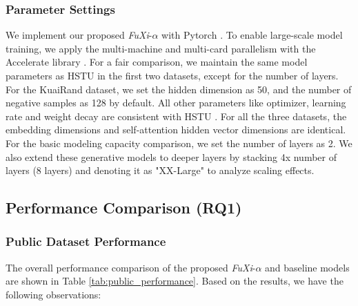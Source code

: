 \subsubsection{Parameter Settings}
We implement our proposed \textit{FuXi}-$\alpha$ with Pytorch \cite{paszke2019pytorch}.
To enable large-scale model training, we apply the multi-machine and multi-card parallelism with the Accelerate library \cite{kotter2012accelerate}.
For a fair comparison, we maintain the same model parameters as HSTU \cite{zhai2024actions} in the first two datasets,
except for the number of layers.
For the KuaiRand dataset, we set the hidden dimension as 50, and the number of negative samples as 128 by default.
All other parameters like optimizer, learning rate and weight decay are consistent with HSTU \cite{zhai2024actions}.
For all the three datasets, the embedding dimensions and self-attention hidden vector dimensions are identical.
For the basic modeling capacity comparison, we set the number of layers as 2.
We also extend these generative models to deeper layers by stacking 4x number of layers (8 layers) and denoting it as "XX-Large" to analyze scaling effects.

\subsection{Performance Comparison  (RQ1)}\label{PerformanceComparison}
\subsubsection{Public Dataset Performance}
The overall performance comparison of the proposed \textit{FuXi}-$\alpha$ and baseline models are shown in Table \ref{tab:public_performance}.
Based on the results, we have the following observations:


